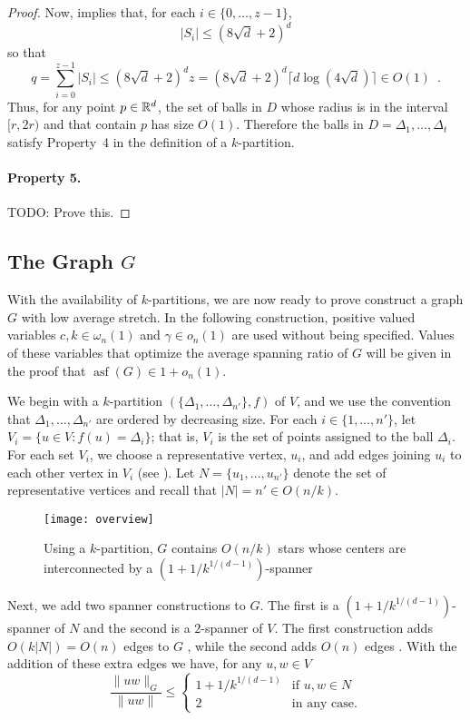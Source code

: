 \documentclass{patmorin}
\DeclareMathOperator{\asf}{asf}
\begin{document}
\begin{proof}
  Now,  implies that, for each $i\in\{0,\ldots,z-1\}$, 
  \[
     |S_i|\le (8\sqrt{d}+2)^d
  \]
  so that
  \[
     q = \sum_{i=0}^{z-1}|S_i|\le (8\sqrt{d}+2)^dz = (8\sqrt{d}+2)^d\lceil d\log(4\sqrt{d})\rceil  \in O(1) \enspace .
  \]
  Thus, for any point $p\in\mathbb{R}^d$, the set of balls in $D$ whose radius
  is in the interval $[r,2r)$ and that contain $p$ has size $O(1)$.
  Therefore the balls in $D=\Delta_1,\ldots,\Delta_t$ satisfy Property~4
  in the definition of a $k$-partition.

  \paragraph{Property 5.}
  TODO: Prove this.
\end{proof}

\subsection{The Graph $G$}

With the availability of $k$-partitions, we are now ready to prove
construct a graph $G$ with low average stretch.  In the following
construction, positive valued variables $c,k\in\omega_n(1)$ and
$\gamma\in o_n(1)$ are used without being specified.  Values of these
variables that optimize the average spanning ratio of $G$ will be given
in the proof that $\asf(G)\in 1+o_n(1)$.

We begin with a $k$-partition $(\{\Delta_1,\ldots,\Delta_{n'}\},f)$
of $V$, and we use the convention that $\Delta_1,\ldots,\Delta_{n'}$
are ordered by decreasing size.  For each $i\in \{1,\ldots,n'\}$,
let $V_i=\{u\in V : f(u)=\Delta_i\}$; that is, $V_i$ is the set of
points assigned to the ball $\Delta_i$.  For each set $V_i$, we choose a
representative vertex, $u_i$, and add edges joining $u_i$ to each other
vertex in $V_i$ (see ). Let $N=\{u_1,\ldots,u_{n'}\}$
denote the set of representative vertices and recall that $|N|=n'\in
O(n/k)$.

\begin{figure}
  \begin{center} 
    \texttt{[image: overview]}
  \end{center} 
  \caption{Using a $k$-partition, $G$ contains $O(n/k)$ stars whose
    centers are interconnected by a $(1+1/k^{1/(d-1)})$-spanner}
\end{figure}

Next, we add two spanner constructions to $G$.  The first is a
$(1+1/k^{1/(d-1)})$-spanner of $N$ and the second is a $2$-spanner
of $V$.  The first construction adds $O(k|N|)=O(n)$ edges to $G$
\cite[Section~5.5]{narasimhan.smid:geometric}, while the second adds
$O(n)$ edges \cite{x,ys,ss}.  With the addition of these extra edges we
have, for any $u,w\in V$
\[
   \frac{\|uw\|_G}{\|uw\|} \le \begin{cases}
         1+1/k^{1/(d-1)} & \text{if $u,w\in N$} \\
         2 & \text{in any case.}
       \end{cases}
\]
\end{document}
